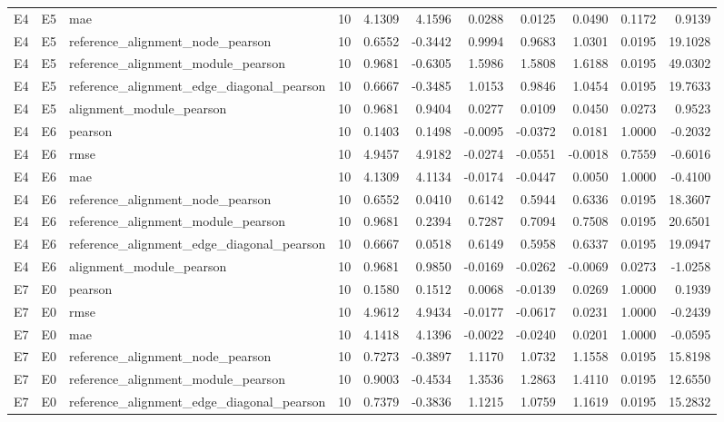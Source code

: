 \begin{tabular}{lllrrrrrrrr}
E4 & E5 & mae & 10 & 4.1309 & 4.1596 & 0.0288 & 0.0125 & 0.0490 & 0.1172 & 0.9139 \\
E4 & E5 & reference_alignment_node_pearson & 10 & 0.6552 & -0.3442 & 0.9994 & 0.9683 & 1.0301 & 0.0195 & 19.1028 \\
E4 & E5 & reference_alignment_module_pearson & 10 & 0.9681 & -0.6305 & 1.5986 & 1.5808 & 1.6188 & 0.0195 & 49.0302 \\
E4 & E5 & reference_alignment_edge_diagonal_pearson & 10 & 0.6667 & -0.3485 & 1.0153 & 0.9846 & 1.0454 & 0.0195 & 19.7633 \\
E4 & E5 & alignment_module_pearson & 10 & 0.9681 & 0.9404 & 0.0277 & 0.0109 & 0.0450 & 0.0273 & 0.9523 \\
E4 & E6 & pearson & 10 & 0.1403 & 0.1498 & -0.0095 & -0.0372 & 0.0181 & 1.0000 & -0.2032 \\
E4 & E6 & rmse & 10 & 4.9457 & 4.9182 & -0.0274 & -0.0551 & -0.0018 & 0.7559 & -0.6016 \\
E4 & E6 & mae & 10 & 4.1309 & 4.1134 & -0.0174 & -0.0447 & 0.0050 & 1.0000 & -0.4100 \\
E4 & E6 & reference_alignment_node_pearson & 10 & 0.6552 & 0.0410 & 0.6142 & 0.5944 & 0.6336 & 0.0195 & 18.3607 \\
E4 & E6 & reference_alignment_module_pearson & 10 & 0.9681 & 0.2394 & 0.7287 & 0.7094 & 0.7508 & 0.0195 & 20.6501 \\
E4 & E6 & reference_alignment_edge_diagonal_pearson & 10 & 0.6667 & 0.0518 & 0.6149 & 0.5958 & 0.6337 & 0.0195 & 19.0947 \\
E4 & E6 & alignment_module_pearson & 10 & 0.9681 & 0.9850 & -0.0169 & -0.0262 & -0.0069 & 0.0273 & -1.0258 \\
E7 & E0 & pearson & 10 & 0.1580 & 0.1512 & 0.0068 & -0.0139 & 0.0269 & 1.0000 & 0.1939 \\
E7 & E0 & rmse & 10 & 4.9612 & 4.9434 & -0.0177 & -0.0617 & 0.0231 & 1.0000 & -0.2439 \\
E7 & E0 & mae & 10 & 4.1418 & 4.1396 & -0.0022 & -0.0240 & 0.0201 & 1.0000 & -0.0595 \\
E7 & E0 & reference_alignment_node_pearson & 10 & 0.7273 & -0.3897 & 1.1170 & 1.0732 & 1.1558 & 0.0195 & 15.8198 \\
E7 & E0 & reference_alignment_module_pearson & 10 & 0.9003 & -0.4534 & 1.3536 & 1.2863 & 1.4110 & 0.0195 & 12.6550 \\
E7 & E0 & reference_alignment_edge_diagonal_pearson & 10 & 0.7379 & -0.3836 & 1.1215 & 1.0759 & 1.1619 & 0.0195 & 15.2832 \\

\end{tabular}
